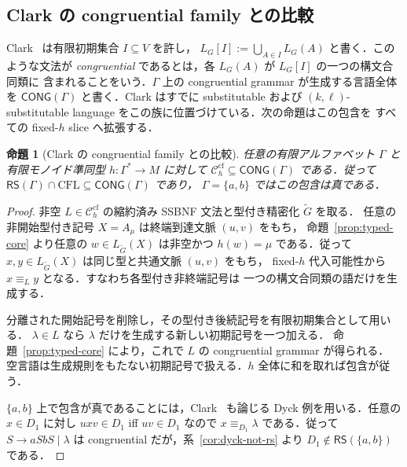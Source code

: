 \documentclass[11pt,a4paper]{ltjsarticle}
\newtheorem{proposition}[theorem]{命題}
\theoremstyle{remark}
\theoremstyle{plain}
\newcommand{\cf}{\mathrm{cf}}
\newcommand{\Ccf}[1]{\mathcal C_{#1}^{\cf}}
\begin{document}
\subsection{Clark の congruential family との比較}

Clark~\cite{clark2010congruential} は有限初期集合 $I\subseteq V$ を許し，
$L_G[I]:=\bigcup_{A\in I}L_G(A)$ と書く．このような文法が
\emph{congruential} であるとは，各 $L_G(A)$ が $L_G[I]$ の一つの構文合同類に
含まれることをいう．$\Gamma$ 上の congruential grammar が生成する言語全体を
$\mathsf{CONG}(\Gamma)$ と書く．Clark はすでに substitutable および
$(k,\ell)$-substitutable language をこの族に位置づけている．次の命題はこの包含を
すべての fixed-$h$ slice へ拡張する．

\begin{proposition}[Clark の congruential family との比較]
\label{prop:clark-congruential-comparison}
任意の有限アルファベット $\Gamma$ と有限モノイド準同型
$h:\Gamma^*\to M$ に対して
$\Ccf{h}\subseteq\mathsf{CONG}(\Gamma)$ である．従って
$\mathsf{RS}(\Gamma)\cap\mathrm{CFL}\subseteq\mathsf{CONG}(\Gamma)$ であり，
$\Gamma=\{a,b\}$ ではこの包含は真である．
\end{proposition}

\begin{proof}
非空 $L\in\Ccf{h}$ の縮約済み SSBNF 文法と型付き精密化 $\widetilde G$ を取る．
任意の非開始型付き記号 $X=A_\mu$ は終端到達文脈 $(u,v)$ をもち，
命題~\ref{prop:typed-core} より任意の
$w\in L_{\widetilde G}(X)$ は非空かつ $h(w)=\mu$ である．従って
$x,y\in L_{\widetilde G}(X)$ は同じ型と共通文脈 $(u,v)$ をもち，
fixed-$h$ 代入可能性から $x\equiv_L y$ となる．すなわち各型付き非終端記号は
一つの構文合同類の語だけを生成する．

分離された開始記号を削除し，その型付き後続記号を有限初期集合として用いる．
$\lambda\in L$ なら $\lambda$ だけを生成する新しい初期記号を一つ加える．
命題~\ref{prop:typed-core} により，これで $L$ の congruential grammar が得られる．
空言語は生成規則をもたない初期記号で扱える．$h$ 全体に和を取れば包含が従う．

$\{a,b\}$ 上で包含が真であることには，Clark~\cite{clark2010congruential} も論じる
Dyck 例を用いる．任意の $x\in D_1$ に対し
$uxv\in D_1$ iff $uv\in D_1$ なので $x\equiv_{D_1}\lambda$ である．従って
$S\to aSbS\mid\lambda$ は congruential だが，系~\ref{cor:dyck-not-rs} より
$D_1\notin\mathsf{RS}(\{a,b\})$ である．
\end{proof}
\end{document}
